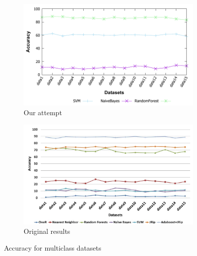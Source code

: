 \begin{figure}[H]
    \centering
    \begin{subfigure}[t]{0.5\textwidth}
        \includegraphics[width=\linewidth]{images/weka_accuracyall}
        \caption{Our attempt}
    \end{subfigure}%
    \begin{subfigure}[t]{0.5\textwidth}
        \includegraphics[width=\linewidth]{images/weka_accuracyall_cite.png}
        \caption{Original results \cite{borges_hink_machine_2014-1}}
    \end{subfigure}
    \caption{Accuracy for multiclass datasets}
    \label{fig:weka_accall}
\end{figure}

